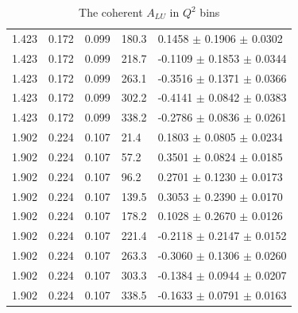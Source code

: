 \begin{table}[!h]
\begin{center}
\begin{tabular}{||l|l|l|l|l||}
  1.423 & 0.172 & 0.099 & 180.3 &  0.1458 $\pm$ 0.1906 $\pm$ 0.0302 \\                                             
  1.423 & 0.172 & 0.099 & 218.7 & -0.1109 $\pm$ 0.1853 $\pm$ 0.0344 \\                                             
  1.423 & 0.172 & 0.099 & 263.1 & -0.3516 $\pm$ 0.1371 $\pm$ 0.0366 \\                                             
  1.423 & 0.172 & 0.099 & 302.2 & -0.4141 $\pm$ 0.0842 $\pm$ 0.0383 \\                                             
  1.423 & 0.172 & 0.099 & 338.2 & -0.2786 $\pm$ 0.0836 $\pm$ 0.0261 \\                                             
  \hline                                                                                                           
  1.902 & 0.224 & 0.107 & 21.4  &  0.1803 $\pm$ 0.0805 $\pm$ 0.0234 \\                                             
  1.902 & 0.224 & 0.107 & 57.2  &  0.3501 $\pm$ 0.0824 $\pm$ 0.0185 \\                                             
  1.902 & 0.224 & 0.107 & 96.2  &  0.2701 $\pm$ 0.1230 $\pm$ 0.0173 \\                                             
  1.902 & 0.224 & 0.107 & 139.5 &  0.3053 $\pm$ 0.2390 $\pm$ 0.0170 \\                                             
  1.902 & 0.224 & 0.107 & 178.2 &  0.1028 $\pm$ 0.2670 $\pm$ 0.0126 \\                                             
  1.902 & 0.224 & 0.107 & 221.4 & -0.2118 $\pm$ 0.2147 $\pm$ 0.0152 \\                                             
  1.902 & 0.224 & 0.107 & 263.3 & -0.3060 $\pm$ 0.1306 $\pm$ 0.0260 \\                                             
  1.902 & 0.224 & 0.107 & 303.3 & -0.1384 $\pm$ 0.0944 $\pm$ 0.0207 \\                                             
  1.902 & 0.224 & 0.107 & 338.5 & -0.1633 $\pm$ 0.0791 $\pm$ 0.0163 \\                                             
         \hline \hline
      \end{tabular}
      \caption{ The coherent $A_{LU}$ in $Q^2$ bins}
      \label{table:Coh_Q2_BSA}
   \end{center}
\end{table}                    

